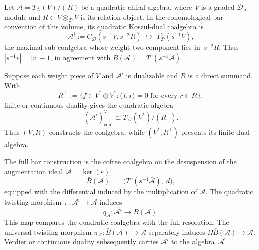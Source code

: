 \begin{definition}\label{def:koszul-dual-quadratic}
Let $\mathcal A=T_{\mathcal D}(V)/(R)$ be a quadratic chiral algebra,
where $V$ is a graded $\mathcal D_X$-module and
$R\subset V\otimes_{\mathcal D}V$ is its relation object.  In the
cohomological bar convention of this volume, its quadratic
Koszul-dual coalgebra is
\begin{equation}\label{eq:koszul-dual-quadratic}
 \mathcal A^i
 :=C_{\mathcal D}(s^{-1}V,s^{-2}R)
 \;\hookrightarrow\;T^c_{\mathcal D}(s^{-1}V),
\end{equation}
the maximal sub-coalgebra whose weight-two component lies
in~$s^{-2}R$.  Thus $|s^{-1}v|=|v|-1$, in agreement with
$\bar B(\mathcal A)=T^c(s^{-1}\bar{\mathcal A})$.

Suppose each weight piece of $V$ and $\mathcal A^i$ is dualizable and
$R$ is a direct summand.  With
\[
 R^\perp
 :=\{f\in V^*\otimes V^*: \langle f,r\rangle=0
 \text{ for every }r\in R\},
\]
finite or continuous duality gives the quadratic algebra
\[
 (\mathcal A^i)^\vee_{\mathrm{cont}}
 \cong T_{\mathcal D}(V^*)/(R^\perp).
\]
Thus $(V,R)$ constructs the coalgebra, while $(V^*,R^\perp)$ presents
its finite-dual algebra.
\end{definition}

\begin{remark}\label{rem:bar-vs-quadratic-dual}
The full bar construction is the cofree coalgebra on the desuspension
of the augmentation ideal $\bar{\mathcal A}=\ker(\varepsilon)$,
\[\bar{B}(\mathcal{A}) \;=\; \bigl(T^c(s^{-1}\bar{\mathcal{A}}),\; d\bigr),\]
equipped with the differential induced by the multiplication of
$\mathcal A$.  The quadratic twisting morphism
$\tau_{\mathrm i}\colon\mathcal A^i\to\mathcal A$ induces
\[
 q_{\mathcal A}\colon\mathcal A^i\longrightarrow\bar B(\mathcal A).
\]
This map compares the quadratic coalgebra with the full resolution.
The universal twisting morphism
$\pi_{\mathcal A}\colon\bar B(\mathcal A)\to\mathcal A$ separately
induces $\Omega\bar B(\mathcal A)\to\mathcal A$.  Verdier or continuous
duality subsequently carries $\mathcal A^i$ to the algebra~$\mathcal A^!$.
\end{remark}

